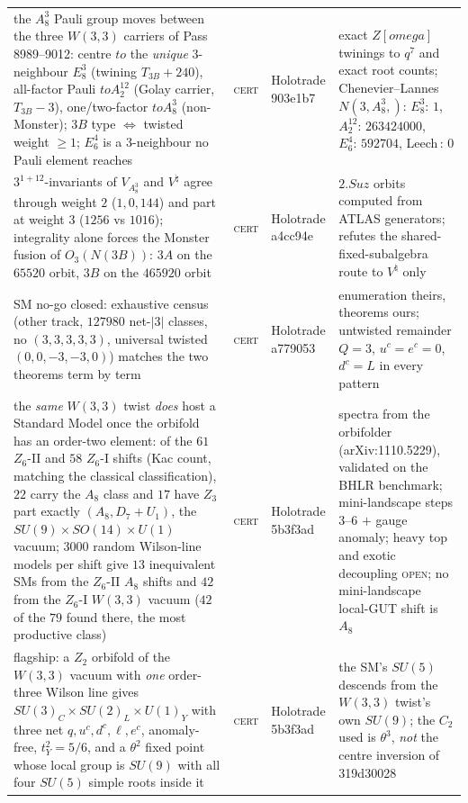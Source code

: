 \documentclass[12pt,a4paper]{article}
\def\mathbb#1{#1}%
\def\textbf#1{#1}%
\def\texttt#1{#1}%
\def\omega{omega}%
\def\cdot{ }%
\def\to{ to }%
\theoremstyle{definition}
\newcommand{\ZZ}{\mathbb{Z}}
\begin{document}
\begin{center}
\begin{tabular}{@{}p{}llp{}@{}}
the $A_8^3$ Pauli group moves between the three $W(3,3)$ carriers of Pass 8989--9012: centre $\to$ the \emph{unique} $3$-neighbour $E_8^3$ (twining $T_{3B}+240$), all-factor Pauli $\to A_2^{12}$ (Golay carrier, $T_{3B}-3$), one/two-factor $\to A_8^3$ (non-Monster); $3B$ type $\iff$ twisted weight $\ge 1$; $E_6^4$ is a $3$-neighbour no Pauli element reaches & \textsc{cert} & Holotrade \texttt{903e1b7} & exact $\ZZ[\omega]$ twinings to $q^7$ and exact root counts; Chenevier--Lannes $N(3,A_8^3,\cdot)$: $E_8^3{:}\,1$, $A_2^{12}{:}\,263424000$, $E_6^4{:}\,592704$, Leech$\,{:}\,0$ \\
$3^{1+12}$-invariants of $V_{A_8^3}$ and $V^\natural$ agree through weight $2$ ($1,0,144$) and part at weight $3$ ($1256$ vs $1016$); integrality alone forces the Monster fusion of $O_3(N(3B))$: $3A$ on the $65520$ orbit, $3B$ on the $465920$ orbit & \textsc{cert} & Holotrade \texttt{a4cc94e} & $2.Suz$ orbits computed from ATLAS generators; refutes the shared-fixed-subalgebra route to $V^\natural$ only \\
\textbf{SM no-go closed}: exhaustive census (other track, $127980$ net-$|3|$ classes, no $(3,3,3,3,3)$, universal twisted $(0,0,-3,-3,0)$) matches the two theorems term by term & \textsc{cert} & Holotrade \texttt{a779053} & enumeration theirs, theorems ours; untwisted remainder $Q=3$, $u^c=e^c=0$, $d^c=L$ in every pattern \\
the \emph{same} $W(3,3)$ twist \emph{does} host a Standard Model once the orbifold has an order-two element: of the $61$ $\ZZ_6$-II and $58$ $\ZZ_6$-I shifts (Kac count, matching the classical classification), $22$ carry the $A_8$ class and $17$ have $\ZZ_3$ part exactly $(A_8,D_7{+}U_1)$, the $SU(9){\times}SO(14){\times}U(1)$ vacuum; $3000$ random Wilson-line models per shift give $13$ inequivalent SMs from the $\ZZ_6$-II $A_8$ shifts and $42$ from the $\ZZ_6$-I $W(3,3)$ vacuum ($42$ of the $79$ found there, the most productive class) & \textsc{cert} & Holotrade \texttt{5b3f3ad} & spectra from the orbifolder (\texttt{arXiv:1110.5229}), validated on the BHLR benchmark; mini-landscape steps 3--6 $+$ gauge anomaly; heavy top and exotic decoupling \textsc{open}; no mini-landscape local-GUT shift is $A_8$ \\
flagship: a $\ZZ_2$ orbifold of the $W(3,3)$ vacuum with \emph{one} order-three Wilson line gives $SU(3)_C{\times}SU(2)_L{\times}U(1)_Y$ with three net $q,u^c,d^c,\ell,e^c$, anomaly-free, $t_Y^2=5/6$, and a $\theta^2$ fixed point whose local group is $SU(9)$ with all four $SU(5)$ simple roots inside it & \textsc{cert} & Holotrade \texttt{5b3f3ad} & the SM's $SU(5)$ descends from the $W(3,3)$ twist's own $SU(9)$; the $C_2$ used is $\theta^3$, \emph{not} the centre inversion of \texttt{319d30028} \\

\end{tabular}
\end{center}
\end{document}
